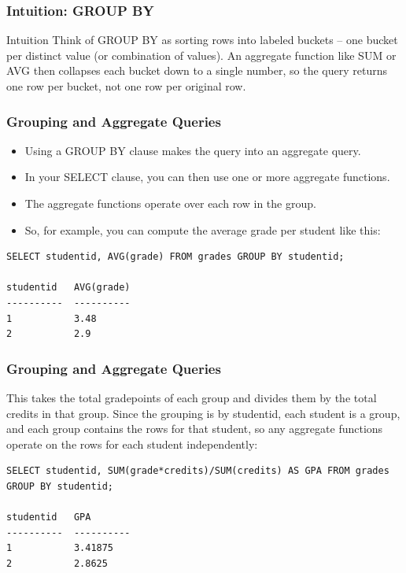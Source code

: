 \begin{frame}[fragile] \frametitle{Intuition: GROUP BY}
\begin{block}{Intuition}
Think of GROUP BY as sorting rows into labeled buckets -- one bucket per distinct value (or
combination of values). An aggregate function like SUM or AVG then collapses each bucket down
to a single number, so the query returns one row per bucket, not one row per original row.
\end{block}
\end{frame}

\begin{frame}[fragile] \frametitle{Grouping and Aggregate Queries}
\begin{itemize}
\item Using a GROUP BY clause makes the query into an aggregate query. 
\item In your SELECT clause, you can then use one or more aggregate functions. 
\item The aggregate functions operate over each row in the group. 
\item So, for example, you can compute the average grade per student like this:
\end{itemize}
\begin{lstlisting}
SELECT studentid, AVG(grade) FROM grades GROUP BY studentid;

studentid   AVG(grade)
----------  ----------
1           3.48      
2           2.9       
\end{lstlisting}
\end{frame}

\begin{frame}[fragile] \frametitle{Grouping and Aggregate Queries}
This takes the total gradepoints of each group and divides them by the total credits in that
group. Since the grouping is by studentid, each student is a group, and each group contains the
rows for that student, so any aggregate functions operate on the rows for each student
independently:
\begin{lstlisting}
SELECT studentid, SUM(grade*credits)/SUM(credits) AS GPA FROM grades GROUP BY studentid;

studentid   GPA
----------  ----------
1           3.41875
2           2.8625
\end{lstlisting}
\end{frame}

